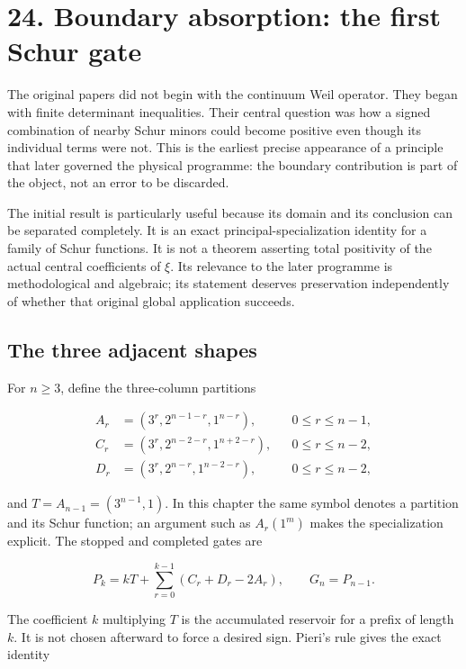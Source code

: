 \documentclass[
  10pt,
  a4paper,
  10pt,
  oneside,
  openany]{book}
\begin{document}
\section{24. Boundary absorption: the first Schur
gate}\label{ch-boundary-gate}

The original papers did not begin with the continuum Weil operator. They
began with finite determinant inequalities. Their central question was
how a signed combination of nearby Schur minors could become positive
even though its individual terms were not. This is the earliest precise
appearance of a principle that later governed the physical programme:
the boundary contribution is part of the object, not an error to be
discarded.

The initial result is particularly useful because its domain and its
conclusion can be separated completely. It is an exact
principal-specialization identity for a family of Schur functions. It is
not a theorem asserting total positivity of the actual central
coefficients of \(\xi\). Its relevance to the later programme is
methodological and algebraic; its statement deserves preservation
independently of whether that original global application succeeds.

\subsection{The three adjacent shapes}\label{the-three-adjacent-shapes}

For \(n\ge3\), define the three-column partitions

\[
\begin{aligned}
 A_r&=(3^r,2^{n-1-r},1^{n-r}),&&0\le r\le n-1,\\
 C_r&=(3^r,2^{n-2-r},1^{n+2-r}),&&0\le r\le n-2,\\
 D_r&=(3^r,2^{n-r},1^{n-2-r}),&&0\le r\le n-2,
\end{aligned}
\]

and \(T=A_{n-1}=(3^{n-1},1)\). In this chapter the same symbol denotes a
partition and its Schur function; an argument such as \(A_r(1^m)\) makes
the specialization explicit. The stopped and completed gates are

\[
 P_k=kT+\sum_{r=0}^{k-1}(C_r+D_r-2A_r),\qquad
 G_n=P_{n-1}.
 \tag{24.1}\label{eq:24.1}
\]

The coefficient \(k\) multiplying \(T\) is the accumulated reservoir for
a prefix of length \(k\). It is not chosen afterward to force a desired
sign. Pieri's rule gives the exact identity
\end{document}
